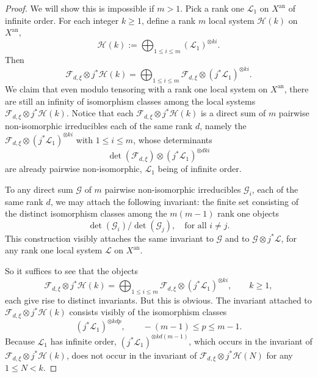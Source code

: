\begin{proof}
We will show this is impossible if \(m>1\). Pick a rank one \(\mathcal{L}_1\) on
\(X^{\mathrm{an}}\) of infinite order. For each integer \(k\geq 1\), define a
rank \(m\) local system \(\mathcal{H}(k)\) on \(X^{\mathrm{an}}\),
\[
  \mathcal{H}(k):=\bigoplus_{1\leq i\leq m}(\mathcal{L}_1)^{\otimes ki}.
\]
Then
\[
  \mathcal{F}_{d,\xi}\otimes j^*\mathcal{H}(k)
  =
  \bigoplus_{1\leq i\leq m}
  \mathcal{F}_{d,\xi}\otimes(j^*\mathcal{L}_1)^{\otimes ki}.
\]
We claim that even modulo tensoring with a rank one local system on
\(X^{\mathrm{an}}\), there are still an infinity of isomorphism classes among
the local systems
\(\mathcal{F}_{d,\xi}\otimes j^*\mathcal{H}(k)\). Notice that each
\(\mathcal{F}_{d,\xi}\otimes j^*\mathcal{H}(k)\) is a direct sum of \(m\)
pairwise non-isomorphic irreducibles each of the same rank \(d\), namely the
\(\mathcal{F}_{d,\xi}\otimes(j^*\mathcal{L}_1)^{\otimes ki}\) with
\(1\leq i\leq m\), whose determinants
\[
  \det(\mathcal{F}_{d,\xi})\otimes(j^*\mathcal{L}_1)^{\otimes dki}
\]
are already pairwise non-isomorphic, \(\mathcal{L}_1\) being of infinite order.

To any direct sum \(\mathcal{G}\) of \(m\) pairwise non-isomorphic irreducibles
\(\mathcal{G}_i\), each of the same rank \(d\), we may attach the following
invariant: the finite set consisting of the distinct isomorphism classes among
the \(m(m-1)\) rank one objects
\[
  \det(\mathcal{G}_i)/\det(\mathcal{G}_j),\quad\text{for all }i\neq j.
\]
This construction visibly attaches the same invariant to \(\mathcal{G}\) and to
\(\mathcal{G}\otimes j^*\mathcal{L}\), for any rank one local system
\(\mathcal{L}\) on \(X^{\mathrm{an}}\).

So it suffices to see that the objects
\[
  \mathcal{F}_{d,\xi}\otimes j^*\mathcal{H}(k)
  =
  \bigoplus_{1\leq i\leq m}
  \mathcal{F}_{d,\xi}\otimes(j^*\mathcal{L}_1)^{\otimes ki},
  \qquad k\geq 1,
\]
each give rise to distinct invariants. But this is obvious. The invariant
attached to \(\mathcal{F}_{d,\xi}\otimes j^*\mathcal{H}(k)\) consists visibly
of the isomorphism classes
\[
  (j^*\mathcal{L}_1)^{\otimes kdp},\qquad -(m-1)\leq p\leq m-1.
\]
Because \(\mathcal{L}_1\) has infinite order,
\((j^*\mathcal{L}_1)^{\otimes kd(m-1)}\), which occurs in the invariant of
\(\mathcal{F}_{d,\xi}\otimes j^*\mathcal{H}(k)\), does not occur in the
invariant of \(\mathcal{F}_{d,\xi}\otimes j^*\mathcal{H}(N)\) for any
\(1\leq N<k\).
\end{proof}
